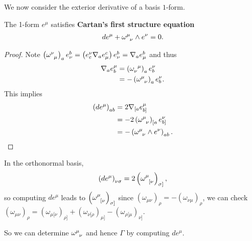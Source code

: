 We now consider the exterior derivative of a basis $1$-form.

\begin{lemma}
    The 1-form $e^{\mu}$ satisfies \textbf{Cartan's first structure equation}
    \begin{align}
        d e^{\mu} + \tensor{\omega}{^{\mu}_\nu} \wedge e^{\nu} = 0
    .\end{align}
\end{lemma}

\begin{proof}
    Note $\left( \tensor{\omega}{^{\nu}_\mu} \right)_a e^{b}_\nu = \left( e_c^{\nu} \nabla_a e^{c}_\mu \right) e^{b}_\nu = \nabla_a e^{b}_\mu$ and thus
    \begin{align}
        \nabla_a e_b^{\mu} &= \left( \tensor{\omega}{_{\nu}^{\mu}} \right)_a e_b^{\nu} \\
        &= - \left( \tensor{\omega}{^{\mu}_\nu} \right)_a e_b^{\nu}
    .\end{align}
    This implies
    \begin{align}
        \left( d e^{\mu} \right)_{ab} &= 2 \nabla_{[a} e^{\mu}_{b]} \\
                                      &= -2 \left( \tensor{\omega}{^{\mu}_{\nu}} \right)_{[a} e_{b]}^{\nu} \\
                                      &= - \left( \tensor{\omega}{^{\mu}_\nu} \wedge e^{\nu} \right)_{ab} 
    .\end{align}
\end{proof}

\begin{note}
    In the orthonormal basis,
    \begin{align}
        \left( de^{\mu} \right)_{\nu \sigma} = 2 \left( \tensor{\omega}{^{\mu}_{[\nu}} \right)_{\sigma]}
    ,\end{align}
    so computing $de^{\mu}$ leads to $\left( \tensor{\omega}{^{\mu}_{[\nu}} \right)_{\sigma]}$ since $\left( \omega_{\mu \nu} \right)_{\rho} = - \left( \omega_{\nu \mu} \right)_{\rho}$, we can check $\left( \omega_{\mu \nu} \right)_{\rho} = \left( \omega_{\mu [\nu} \right)_{\rho]} + \left( \omega_{\nu [\rho} \right)_{\mu]} - \left( \omega_{\rho [\mu} \right)_{\nu]}$.
\end{note}

So we can determine $\tensor{\omega}{^{\mu}_\nu}$ and hence $\Gamma$ by computing $de^{\mu}$.

